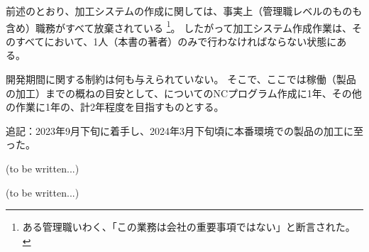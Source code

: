 




前述のとおり、加工システムの作成に関しては、事実上（管理職レベルのものも含め）職務がすべて放棄されている
\footnote{ある管理職いわく、「この業務は会社の重要事項ではない」と断言された。}。
したがって加工システム作成作業は、そのすべてにおいて、1人（本書の著者）のみで行わなければならない状態にある。



開発期間に関する制約は何も与えられていない。
そこで、ここでは稼働（製品の加工）までの概ねの目安として、\Dimple についてのNCプログラム作成に1年、その他の作業に1年の、計2年程度を目指すものとする。
\begin{marker}
追記：2023年9月下旬に着手し、2024年3月下旬頃に本番環境での製品の加工に至った。
\end{marker}



(to be written...)



(to be written...)

